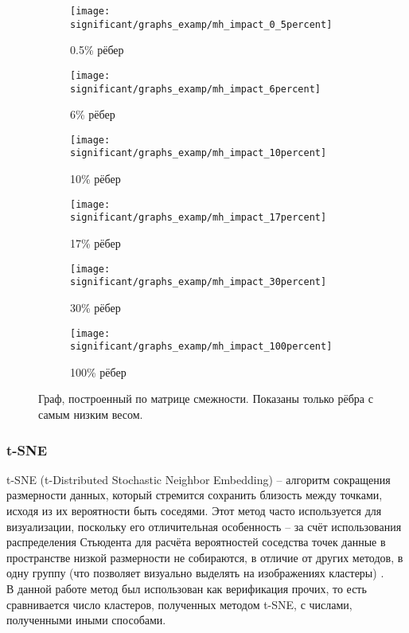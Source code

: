 \documentclass[main.tex]{subfiles}
\begin{document}
\begin{figure}[H]
    \centering
    \begin{subfigure}{.3\textwidth}
        \centering
        \texttt{[image: significant/graphs\_examp/mh\_impact\_0\_5percent]}
        \captionsetup{width=.8\linewidth}
        \caption{0.5\% рёбер}
        \label{fig:graphs_0_5}
    \end{subfigure}%
    \begin{subfigure}{.3\textwidth}
        \centering
        \texttt{[image: significant/graphs\_examp/mh\_impact\_6percent]}
        \captionsetup{width=.8\linewidth}
        \caption{6\% рёбер}
    \end{subfigure}%
    \begin{subfigure}{.3\textwidth}
        \centering
        \texttt{[image: significant/graphs\_examp/mh\_impact\_10percent]}
        \captionsetup{width=.8\linewidth}
        \caption{10\% рёбер}
    \end{subfigure}

    \begin{subfigure}{.3\textwidth}
        \centering
        \texttt{[image: significant/graphs\_examp/mh\_impact\_17percent]}
        \captionsetup{width=.8\linewidth}
        \caption{17\% рёбер}
    \end{subfigure}%
    \begin{subfigure}{.3\textwidth}
        \centering
        \texttt{[image: significant/graphs\_examp/mh\_impact\_30percent]}
        \captionsetup{width=.8\linewidth}
        \caption{30\% рёбер}
    \end{subfigure}%
    \begin{subfigure}{.3\textwidth}
        \centering
        \texttt{[image: significant/graphs\_examp/mh\_impact\_100percent]}
        \captionsetup{width=.8\linewidth}
        \caption{100\% рёбер}
        \label{fig:graphs_100}
    \end{subfigure}
    \caption{Граф, построенный по матрице смежности. Показаны только рёбра с самым низким весом.}
\end{figure}


\subsubsection{t-SNE}

t-SNE (t-Distributed Stochastic Neighbor Embedding) -- алгоритм сокращения размерности данных, который стремится сохранить близость между точками, исходя из их вероятности быть соседями. Этот метод часто используется для визуализации, поскольку его отличительная особенность -- за счёт использования распределения Стьюдента для расчёта вероятностей соседства точек данные в пространстве низкой размерности не собираются, в отличие от других методов, в одну группу (что позволяет визуально выделять на изображениях кластеры) \cite{tsne}. \\
В данной работе метод был использован как верификация прочих, то есть сравнивается число кластеров, полученных методом t-SNE, с числами, полученными иными способами.
\end{document}
